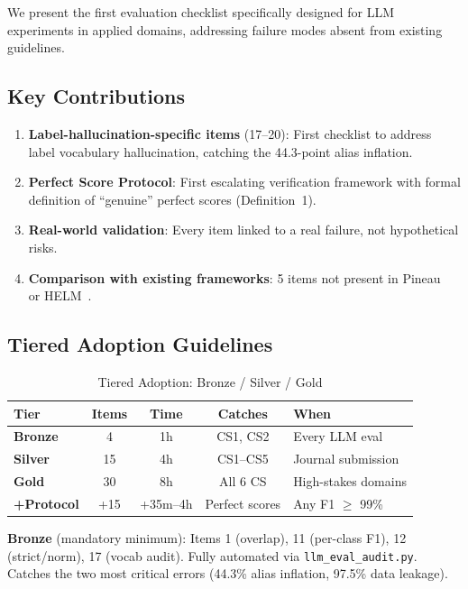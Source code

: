 \documentclass[review,3p]{elsarticle}
\begin{document}
We present the first evaluation checklist specifically designed for LLM experiments in applied domains, addressing failure modes absent from existing guidelines.

\subsection{Key Contributions}
\begin{enumerate}
\item \textbf{Label-hallucination-specific items} (17--20): First checklist to address label vocabulary hallucination, catching the 44.3-point alias inflation.
\item \textbf{Perfect Score Protocol}: First escalating verification framework with formal definition of ``genuine'' perfect scores (Definition~1).
\item \textbf{Real-world validation}: Every item linked to a real failure, not hypothetical risks.
\item \textbf{Comparison with existing frameworks}: 5 items not present in Pineau~\cite{pineau2021} or HELM~\cite{liang2022}.
\end{enumerate}

\subsection{Tiered Adoption Guidelines}

\begin{table}[!ht]
\centering
\caption{Tiered Adoption: Bronze / Silver / Gold}
\label{tab:tiers}
\begin{tabular}{lcccl}
\toprule
\textbf{Tier} & \textbf{Items} & \textbf{Time} & \textbf{Catches} & \textbf{When} \\
\midrule
\textbf{Bronze} & 4 & 1h & CS1, CS2 & Every LLM eval \\
\textbf{Silver} & 15 & 4h & CS1--CS5 & Journal submission \\
\textbf{Gold} & 30 & 8h & All 6 CS & High-stakes domains \\
\textbf{+Protocol} & +15 & +35m--4h & Perfect scores & Any F1 $\geq$ 99\% \\
\bottomrule
\end{tabular}
\end{table}

\textbf{Bronze} (mandatory minimum): Items 1 (overlap), 11 (per-class F1), 12 (strict/norm), 17 (vocab audit). Fully automated via \texttt{llm\_eval\_audit.py}. Catches the two most critical errors (44.3\% alias inflation, 97.5\% data leakage).
\end{document}
